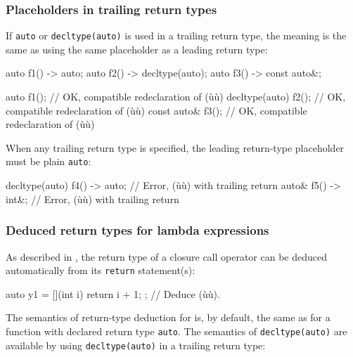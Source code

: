 \subsubsection[Placeholders in trailing return types]{Placeholders in trailing return types}\label{placeholders-in-trailing-return-types}

If \lstinline!auto! or \lstinline!decltype(auto)! is used in a trailing return
type, the meaning is the same as using the same placeholder as a leading
return type:

\begin{emcppslisting}
auto f1() -> auto;
auto f2() -> decltype(auto);
auto f3() -> const auto&;

auto           f1();  // OK, compatible redeclaration of (ù{}ù)
decltype(auto) f2();  // OK, compatible redeclaration of (ù{}ù)
const auto&    f3();  // OK, compatible redeclaration of (ù{}ù)
\end{emcppslisting}
    

\noindent When any trailing return type is specified, the leading return-type
placeholder must be plain \lstinline!auto!:

\begin{emcppslisting}
decltype(auto) f4() -> auto;  // Error, (ù{}ù) with trailing return
auto&          f5() -> int&;  // Error, (ù{}ù) with trailing return
\end{emcppslisting}
    

\subsubsection[Deduced return types for lambda expressions]{Deduced return types for lambda expressions}\label{deduced-return-types-for-lambda-expressions}

As described in , the return type of a closure call
operator can be deduced automatically from its \lstinline!return!
statement(s):

\begin{emcppslisting}
auto y1 = [](int i) { return i + 1; };  // Deduce (ù{}ù).
\end{emcppslisting}
    

\noindent The semantics of return-type deduction for 
is, by default, the same as for a function with declared return type
\lstinline!auto!. The semantics of \lstinline!decltype(auto)! are available by
using \lstinline!decltype(auto)! in a trailing return type:

